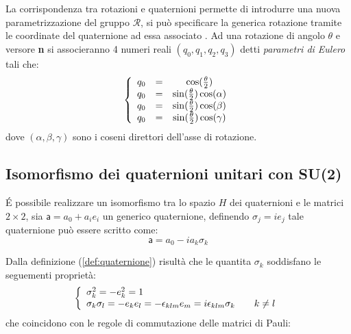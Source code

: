 \documentclass[11pt]{report}
\theoremstyle{plain}
\theoremstyle{definition}
\theoremstyle{remark}
\begin{document}
La corrispondenza tra rotazioni e quaternioni permette di introdurre una nuova parametrizzazione del gruppo $\mathscr{R}$, si può specificare la generica rotazione tramite le coordinate del quaternione ad essa associato .
Ad una rotazione di angolo $\theta$ e versore \textbf{n} si associeranno 4 numeri reali $(q_{0},q_{1},q_{2},q_{3})$ detti \emph{parametri di Eulero} tali che:
	\begin{displaymath}
\left\{ 
			\begin{array}{c c c}
 			q_{0} & = & \cos(\frac{\theta}{2})  \\	
 			q_{0} & = & \sin(\frac{\theta}{2})\cos(\alpha) \\
 			q_{0} & = & \sin(\frac{\theta}{2})\cos(\beta) \\
 			q_{0} & = & \sin(\frac{\theta}{2})\cos(\gamma) \\  			\end{array} \right.
	\end{displaymath}	
dove $(\alpha, \beta, \gamma)$ sono i coseni direttori dell'asse di rotazione.
 
\subsection{Isomorfismo dei quaternioni unitari con SU(2)}
É possibile realizzare un isomorfismo tra lo spazio $H$ dei quaternioni e le matrici $2 \times 2$, sia $\mathsf{a} = a_{0} + a_{i}e_{i}$ un generico quaternione, definendo $\sigma_{j} = i e_{j} $ tale quaternione può essere scritto come:
$$\mathsf{a} = a_{0} - i a_{k}\sigma_{k}$$

Dalla definizione (\ref{def:quaternione}) risultà che le quantita $\sigma_{k}$ soddisfano le seguementi proprietà: 
	\begin{equation}\label{eq:algebrapauli}
	\left\{ 
			\begin{array}{l c c}
 			\sigma_{k}^{2}=-e_{k}^{2}=1 & & \\	
 			\sigma_{k}\sigma_{l}=-e_{k}e_{l}=- \epsilon_{klm} e_{m} = i\epsilon_{klm} \sigma_{k}  & & k \neq l \\
  			\end{array} \right.
	\end{equation}	
che coincidono con le regole di commutazione delle matrici di Pauli:
\end{document}
